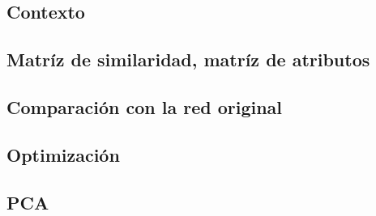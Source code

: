 
\vspace{2em}
\subsection{Contexto}





\vspace{2em}
\subsection{Matríz de similaridad, matríz de atributos}





\vspace{2em}
\subsection{Comparación con la red original}





\vspace{2em}
\subsection{Optimización}





\vspace{2em}
\subsection{PCA}
